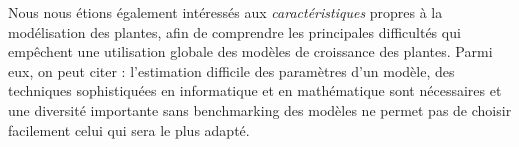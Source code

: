 Nous nous étions également intéressés aux \emph{caractéristiques} propres à la modélisation des plantes, afin de comprendre les principales difficultés qui empêchent une utilisation globale des modèles de croissance des plantes. Parmi eux, on peut citer : l’estimation difficile des paramètres d’un modèle, des techniques sophistiquées en informatique et en mathématique sont nécessaires et une diversité importante sans benchmarking des modèles ne permet pas de choisir facilement celui qui sera le plus adapté. 

% 